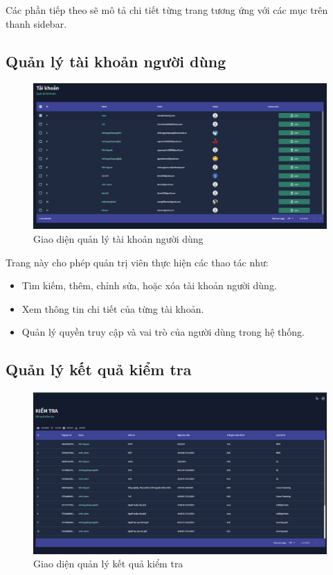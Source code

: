 Các phần tiếp theo sẽ mô tả chi tiết từng trang tương ứng với các mục trên thanh sidebar.

\subsection{Quản lý tài khoản người dùng}
\label{sec:account_management}
\begin{figure}[H]
    \centering
    \includegraphics[width=0.75\linewidth]{images/accAdmin.png}
    \vspace{0.6cm}
    \caption{Giao diện quản lý tài khoản người dùng}
\end{figure}

Trang này cho phép quản trị viên thực hiện các thao tác như:
\begin{itemize}
    \item Tìm kiếm, thêm, chỉnh sửa, hoặc xóa tài khoản người dùng.
    \item Xem thông tin chi tiết của từng tài khoản.
    \item Quản lý quyền truy cập và vai trò của người dùng trong hệ thống.
\end{itemize}

\subsection{Quản lý kết quả kiểm tra}
\label{sec:test_management}
\begin{figure}[H]
    \centering
    \includegraphics[width=0.75\linewidth]{images/testAdmin.png}
    \vspace{0.6cm}
    \caption{Giao diện quản lý kết quả kiểm tra}
\end{figure}

